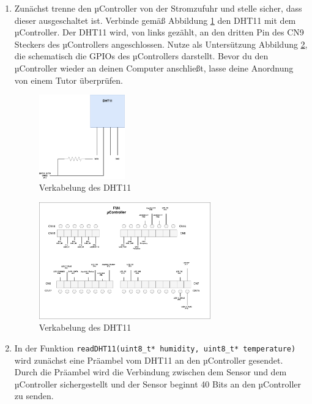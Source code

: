 \begin{enumerate}
\item 
Zunächst trenne den µController von der Stromzufuhr und stelle sicher, dass dieser ausgeschaltet ist.
Verbinde gemäß Abbildung \ref{fig:dht11Schematics} den DHT11 mit dem µController.
Der DHT11 wird, von links gezählt, an den dritten Pin des CN9 Steckers des µControllers angeschlossen.
Nutze als Untersützung Abbildung \ref{fig:cpppWiring}, die schematisch die GPIOs des µControllers darstellt.
Bevor du den µController wieder an deinen Computer anschließt, lasse deine Anordnung von einem Tutor überprüfen.

\begin{figure}[!htb]
	\centering
	\includegraphics[width=0.35\textwidth]{./05_c/figures/DHT11-Schematics.pdf}
	\caption{Verkabelung des DHT11}
	\label{fig:dht11Schematics}
\end{figure} 
\begin{figure}[!htb]
	\centering
	\includegraphics[width=0.7\textwidth]{./05_c/figures/cppp-wiring.pdf}
	\caption{Verkabelung des DHT11}
	\label{fig:cpppWiring}
\end{figure} 
\item 
In der Funktion \lstinline|readDHT11(uint8_t* humidity, uint8_t* temperature)| wird zunächst eine Präambel vom DHT11 an den µController gesendet.
Durch die Präambel wird die Verbindung zwischen dem Sensor und dem µController sichergestellt und der Sensor beginnt 40 Bits an den µController zu senden.

\end{enumerate}
